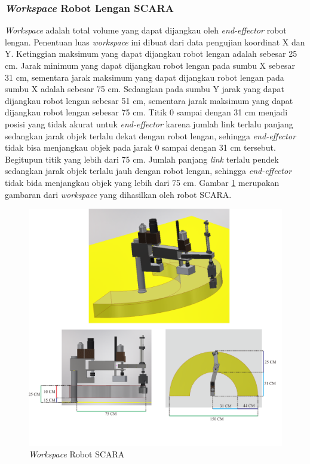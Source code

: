 \subsubsection{\textit{Workspace} Robot Lengan SCARA }
\textit{Workspace} adalah total volume yang dapat dijangkau oleh \textit{end-effector} robot lengan. Penentuan luas \textit{workspace} ini dibuat dari data pengujian koordinat X dan Y. Ketinggian maksimum yang dapat dijangkau robot lengan adalah sebesar 25 cm. Jarak minimum yang dapat dijangkau robot lengan pada sumbu X sebesar 31 cm, sementara jarak maksimum yang dapat dijangkau robot lengan pada sumbu X adalah sebesar 75 cm. Sedangkan pada sumbu Y jarak yang dapat dijangkau robot lengan sebesar 51 cm, sementara jarak maksimum yang dapat dijangkau robot lengan sebesar 75 cm. Titik 0 sampai dengan 31 cm menjadi posisi yang tidak akurat untuk \textit{end-effector} karena jumlah link terlalu panjang sedangkan jarak objek terlalu dekat dengan robot lengan, sehingga \textit{end-effector} tidak bisa menjangkau objek pada jarak 0 sampai dengan 31 cm tersebut. Begitupun titik yang lebih dari 75 cm. Jumlah panjang \textit{link} terlalu pendek sedangkan jarak objek terlalu jauh dengan robot lengan, sehingga \textit{end-effector} tidak bida menjangkau objek yang lebih dari 75 cm. Gambar \ref{pic.workpace} merupakan gambaran dari \textit{workspace} yang dihasilkan oleh robot SCARA.
 \begin{figure}[H]
	\centering
	\includegraphics[width=12cm]{gambar/workspace.png}
	\caption{\textit{Workspace} Robot SCARA}
	\label{pic.workpace}
\end{figure}


